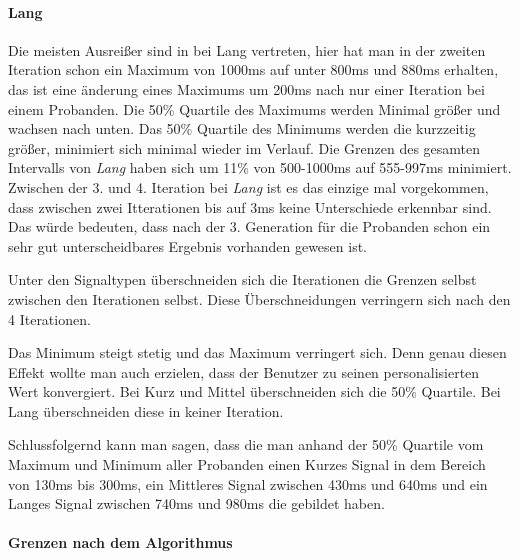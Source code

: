 \paragraph{Lang}
Die meisten Ausrei{\ss}er sind in bei Lang vertreten, hier hat man in der zweiten Iteration schon ein Maximum von 1000ms auf unter 800ms und 880ms erhalten, das ist eine {\"a}nderung eines Maximums um 200ms nach nur einer Iteration bei einem Probanden.
Die 50\% Quartile des Maximums werden Minimal gr{\"o}{\ss}er und wachsen nach unten.
Das 50\% Quartile des Minimums werden die kurzzeitig gr{\"o}{\ss}er, minimiert sich minimal wieder im Verlauf.
Die Grenzen des gesamten Intervalls von \textit{Lang} haben sich um 11\% von 500-1000ms auf 555-997ms minimiert.
Zwischen der 3. und 4. Iteration bei \textit{Lang} ist es das einzige mal vorgekommen, dass zwischen zwei Itterationen bis auf 3ms keine Unterschiede erkennbar sind.
Das w{\"u}rde bedeuten, dass nach der 3. Generation f{\"u}r die Probanden schon ein sehr gut unterscheidbares Ergebnis vorhanden gewesen ist.


Unter den Signaltypen {\"u}berschneiden sich die Iterationen die Grenzen selbst zwischen den Iterationen selbst. 
Diese {\"U}berschneidungen verringern sich nach den 4 Iterationen.

Das Minimum steigt stetig und das Maximum verringert sich. 
Denn genau diesen Effekt wollte man auch erzielen, dass der Benutzer zu seinen personalisierten Wert konvergiert.
Bei Kurz und Mittel {\"u}berschneiden sich die 50\% Quartile. 
Bei Lang {\"u}berschneiden diese in keiner Iteration.

Schlussfolgernd kann man sagen, dass die man anhand der 50\% Quartile vom Maximum und Minimum aller Probanden einen Kurzes Signal in dem Bereich von 130ms bis 300ms, ein Mittleres Signal zwischen 430ms und 640ms und ein Langes Signal zwischen 740ms und 980ms die gebildet haben. 




\paragraph{Grenzen nach dem Algorithmus}

